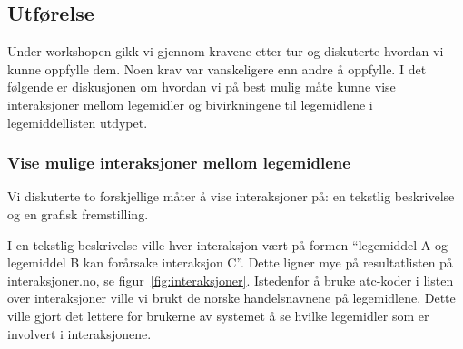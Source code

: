 \subsection{Utførelse}
Under workshopen gikk vi gjennom kravene etter tur og diskuterte hvordan vi kunne oppfylle dem. Noen krav var vanskeligere enn andre å oppfylle. I det følgende er diskusjonen om hvordan vi på best mulig måte kunne vise interaksjoner mellom legemidler og bivirkningene til legemidlene i legemiddellisten utdypet. 

\subsubsection{Vise mulige interaksjoner mellom legemidlene}
Vi diskuterte to forskjellige måter å vise interaksjoner på: en tekstlig beskrivelse og en grafisk fremstilling.

I en tekstlig beskrivelse ville hver interaksjon vært på formen “legemiddel A og legemiddel B kan forårsake interaksjon C”. Dette ligner mye på resultatlisten på interaksjoner.no, se figur~\ref{fig:interaksjoner}. Istedenfor å bruke \acrshort{atc}-koder i listen over interaksjoner ville vi brukt de norske handelsnavnene på legemidlene. Dette ville gjort det lettere for brukerne av systemet å se hvilke legemidler som er involvert i interaksjonene. 

